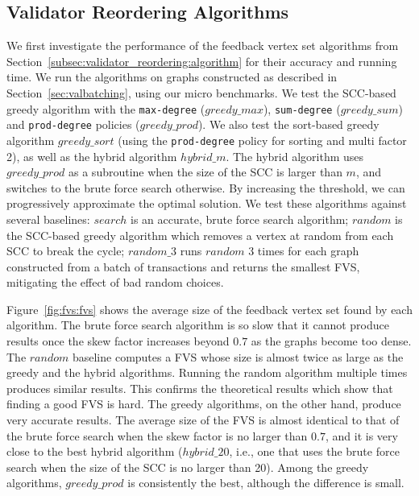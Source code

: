 \subsection{Validator Reordering Algorithms}
\label{sec:exp_algorithms}
We first investigate the performance of the feedback vertex set algorithms from Section~\ref{subsec:validator_reordering:algorithm} 
for their accuracy and running time. We run the algorithms on graphs constructed as described in Section~\ref{sec:valbatching}, using our micro benchmarks. 
We test the SCC-based greedy algorithm with the \texttt{max-degree} ($greedy\_max$), \texttt{sum-degree} ($greedy\_sum$) and \texttt{prod-degree} policies ($greedy\_prod$). We also test the sort-based greedy algorithm $greedy\_sort$ (using the \texttt{prod-degree} policy for sorting and multi factor 2), as well as the hybrid algorithm $hybrid\_m$. The hybrid algorithm uses $greedy\_prod$ as a subroutine when the size of the SCC is larger than $m$, and switches to the brute force search otherwise. By increasing the threshold, we can progressively approximate the optimal solution. 
We test these algorithms against several baselines: $search$ is an accurate,
brute force search algorithm; $random$ is the SCC-based greedy algorithm which
removes a vertex at random from each SCC to break the cycle; $random\_3$ runs $random$ 3 times for each graph constructed from a batch of transactions and returns the smallest FVS, mitigating the
effect of bad random choices.

Figure~\ref{fig:fvs:fvs} shows the average size of the feedback vertex set found by each algorithm. The brute force search algorithm is so slow that it cannot produce results once the skew factor increases beyond $0.7$ as the graphs become too dense.
The $random$ baseline computes a FVS whose size is almost twice as large as the greedy and the hybrid algorithms. Running the random algorithm multiple times produces similar results. This confirms the theoretical results which show that finding a good FVS is hard. The greedy algorithms, on the other hand, produce very accurate results. The average size of the FVS is almost identical to that of the brute force search when the skew factor is no larger than $0.7$, and it is very close to the best hybrid algorithm ($hybrid\_20$, i.e., one that uses the brute force search when the size of the SCC is no larger than 20). Among the greedy algorithms, $greedy\_prod$ is consistently the best, although the difference is small.

